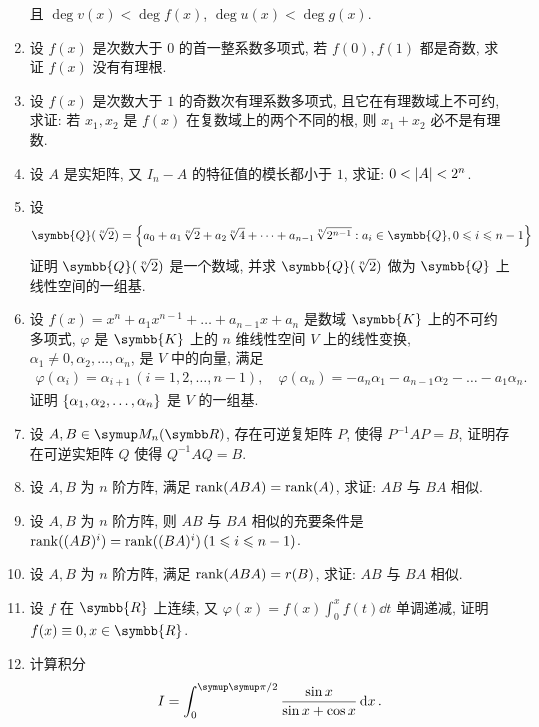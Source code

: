 \documentclass{ctexart}
\let\umathpi\pi
\renewcommand\pi{\symup\umathpi}%
\let\set\qty
\let\le\leqslant
\newcommand{\R}{\ensuremath{\symbb{R}}}
\newcommand{\K}{\ensuremath{\symbb{K}}}
\newcommand{\Q}{\ensuremath{\symbb{Q}}}
\begin{document}
\begin{enumerate}[series=exer]
    且 $ \deg v(x) < \deg f(x) $, $ \deg u(x) < \deg g(x) $.  
    \item 设 $ f(x) $ 是次数大于 $ 0 $ 的首一整系数多项式, 若 $ f(0), f(1) $ 都是奇数, 求证 $ f(x) $ 没有有理根.
    \item 设 $ f(x) $ 是次数大于 $ 1 $ 的奇数次有理系数多项式, 且它在有理数域上不可约, 求证: 若 $ x_{1}, x_{2} $ 是 $ f(x) $ 在复数域上的两个不同的根, 则 $ x_{1} + x_{2} $ 必不是有理数.
    \item 设 $ A $ 是实矩阵, 又 $ I_{n} - A $ 的特征值的模长都小于 $ 1 $, 求证: $ 0<\abs{A}<2^{n} $. 
    \item 设
    \begin{align*}
        \Q(\sqrt[n]{2}) = \set{a_{0} + a_{1}\sqrt[n]{2} + a_{2}\sqrt[n]{4} + \dots + a_{n-1}\sqrt[n]{2^{n-1}} : a_{i} \in \Q, 0\le i\le n-1}
    \end{align*}
    证明 $ \Q(\sqrt[n]{2}) $ 是一个数域, 并求 $ \Q(\sqrt[n]{2}) $ 做为 $ \Q $ 上线性空间的一组基.
    \item 设 $ f(x) = x^{n} + a_{1}x^{n-1} + \dots + a_{n-1}x + a_{n} $ 是数域 $ \K $ 上的不可约多项式, $ \varphi $ 是 $ \K $ 上的 $ n $ 维线性空间 $ V $ 上的线性变换, $ \alpha_{1} \ne 0, \alpha_{2}, \dots, \alpha_{n} $, 是 $ V $ 中的向量, 满足 
    \begin{align*}
        \varphi(\alpha_{i}) = \alpha_{i + 1}\,(i = 1, 2, \dots, n-1), \quad \varphi(\alpha_{n}) = -a_{n}\alpha_{1} - a_{n-1}\alpha_{2} - \dots - a_{1}\alpha_{n}.
    \end{align*}
    证明 $ \set{\alpha_{1}, \alpha_{2}, \dots, \alpha_{n}} $ 是 $ V $ 的一组基. 
    \item\label{item:CtoR} 设 $ A, B \in \MM $, 存在可逆复矩阵 $ P $, 使得 $ P^{-1}AP = B $, 证明存在可逆实矩阵 $ Q $ 使得 $ Q^{-1}AQ = B $.   
    \item 设 $ A, B $ 为 $ n $ 阶方阵, 满足 $ \rank(ABA) = \rank(A) $, 求证: $ AB $ 与 $ BA $ 相似.
    \item 设 $ A, B $ 为 $ n $ 阶方阵, 则 $ AB $ 与 $ BA $ 相似的充要条件是 $ \rank((AB)^{i}) = \rank((BA)^{i})\,(1 \le i \le n - 1) $.
    \item  设 $ A, B $ 为 $ n $ 阶方阵, 满足 $ \rank(ABA) = r(B) $, 求证: $ AB $ 与 $ BA $ 相似.
    \item 设 $ f $ 在 $ \R $ 上连续, 又 $ \varphi(x) = f(x)\int_{0}^{x} f(t) \dd{t} $ 单调递减, 证明 $ f(x) \equiv 0, x\in\R $.
    \item 计算积分
    \begin{align*}
        I = \int_{0}^{\pi/2} \frac{\sin x}{\sin x + \cos x} \dd{x}.

\end{align*}
\end{enumerate}
\end{document}
